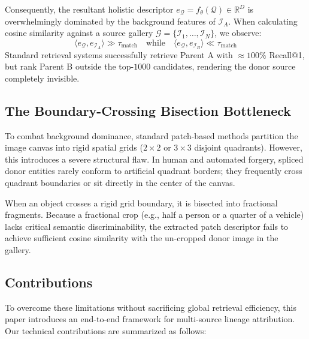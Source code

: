 \documentclass[journal]{IEEEtran}
\begin{document}
Consequently, the resultant holistic descriptor $e_\mathcal{Q} = f_\theta(\mathcal{Q}) \in \mathbb{R}^D$ is overwhelmingly dominated by the background features of $\mathcal{I}_A$. When calculating cosine similarity against a source gallery $\mathcal{G} = \{\mathcal{I}_1, \dots, \mathcal{I}_N\}$, we observe:
\begin{equation}
\langle e_\mathcal{Q}, e_{\mathcal{I}_A} \rangle \gg \tau_{\text{match}} \quad \text{while} \quad \langle e_\mathcal{Q}, e_{\mathcal{I}_B} \rangle \ll \tau_{\text{match}}
\end{equation}
Standard retrieval systems successfully retrieve Parent A with $\approx 100\%$ Recall@1, but rank Parent B outside the top-$1000$ candidates, rendering the donor source completely invisible.

\subsection{The Boundary-Crossing Bisection Bottleneck}
To combat background dominance, standard patch-based methods partition the image canvas into rigid spatial grids ($2 \times 2$ or $3 \times 3$ disjoint quadrants). However, this introduces a severe structural flaw. In human and automated forgery, spliced donor entities rarely conform to artificial quadrant borders; they frequently cross quadrant boundaries or sit directly in the center of the canvas. 

When an object crosses a rigid grid boundary, it is bisected into fractional fragments. Because a fractional crop (e.g., half a person or a quarter of a vehicle) lacks critical semantic discriminability, the extracted patch descriptor fails to achieve sufficient cosine similarity with the un-cropped donor image in the gallery.

\subsection{Contributions}
To overcome these limitations without sacrificing global retrieval efficiency, this paper introduces an end-to-end framework for multi-source lineage attribution. Our technical contributions are summarized as follows:
\end{document}
